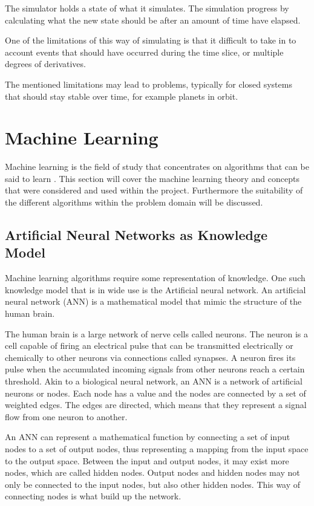 The simulator holds a state of what it simulates. The simulation progress by calculating what the new state should be after an amount of time have elapsed.

One of the limitations of this way of simulating is that it difficult to take in to account events that should have occurred during the time slice, or multiple degrees of derivatives. 

The mentioned limitations may lead to problems, typically for closed systems that should stay stable over time, for example planets in orbit. 


\section{Machine Learning}
Machine learning is the field of study that concentrates on algorithms that can be said to learn \cite{glossary}. This section will cover the machine learning theory and concepts that were considered and used within the project. Furthermore the suitability of the different algorithms within the problem domain will be discussed.  

\subsection{Artificial Neural Networks as Knowledge Model}
Machine learning algorithms require some representation of knowledge. One such knowledge model that is in wide use is the Artificial neural network. An artificial neural network (ANN) is a mathematical model that mimic the structure of the human brain. 

The human brain is a large network of nerve cells called neurons. The neuron is a cell capable of firing an electrical pulse that can be transmitted electrically or chemically to other neurons via connections called synapses. A neuron fires its pulse when the accumulated incoming signals from other neurons reach a certain threshold. Akin to a biological neural network, an ANN is a network of artificial neurons or nodes. Each node has a value and the nodes are connected by a set of weighted edges. The edges are directed, which means that they represent a signal flow from one neuron to another.

An ANN can represent a mathematical function by connecting a set of input nodes to a set of output nodes, thus representing a mapping from the input space to the output space. Between the input and output nodes, it may exist more nodes, which are called hidden nodes. Output nodes and hidden nodes may not only be connected to the input nodes, but also other hidden nodes. This way of connecting nodes is what build up the network.

